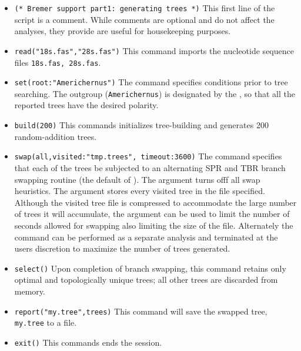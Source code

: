 \begin{itemize}
\item \texttt{(* Bremer support part1: generating trees *)} This first line of the script is a comment. While comments are optional and do not affect the analyses, they provide are useful for housekeeping purposes. 
\item \texttt{read("18s.fas","28s.fas")} This command imports the nucleotide sequence files \texttt{18s.fas, 28s.fas}.
\item \texttt{set(root:"Americhernus")} The  command specifies conditions prior to tree searching. The outgroup (\texttt{Americhernus}) is designated by the , so that all the reported trees have the desired polarity.     
\item \texttt{build(200)} This commands initializes tree-building and generates 200 random-addition trees.      
\item \texttt{swap(all,visited:"tmp.trees", timeout:3600)} The  command specifies that each of the trees be subjected to an alternating SPR and TBR branch swapping routine (the default of \poy).  The  argument turns offf all swap heuristics. The  argument stores every visited tree in the file specified.  Although the visited tree file is compressed to accommodate the large number of trees it will accumulate, the argument  can be used to limit the number of seconds allowed for swapping also limiting the size of the file.  Alternately  the   command can be performed as a separate analysis and terminated at the users discretion to maximize the number of trees generated.
\item \texttt{select()} Upon completion of branch swapping, this command retains only optimal and topologically unique trees; all other trees are discarded from memory. 
\item \texttt{report("my.tree",trees)} This command will save the swapped tree, \\ \texttt{my.tree} to a file. 
\item \texttt{exit()} This commands ends the \poy session.


\end{itemize}
